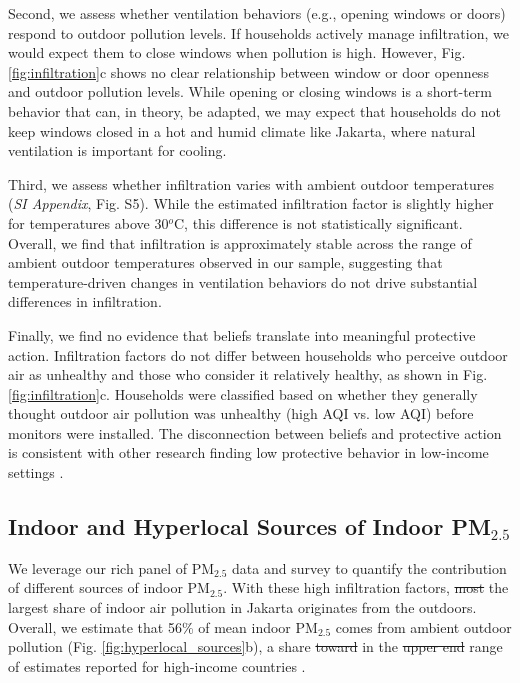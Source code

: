 \documentclass[9pt,twocolumn,twoside]{pnas-new}
\providecommand{\DIFadd}[1]{{\protect\color{red}#1}}
\providecommand{\DIFdel}[1]{{\protect\color{red}\protect\sout{#1}}}
\begin{document}
Second, we assess whether ventilation behaviors (e.g., opening windows or doors) respond to outdoor pollution levels. If households actively manage infiltration, we would expect them to close windows when pollution is high. However, Fig. \ref{fig:infiltration}c shows no clear relationship between window or door openness and outdoor pollution levels. While opening or closing windows is a short-term behavior that can, in theory, be adapted, we may expect that households do not keep windows closed in a hot and humid climate like Jakarta, where natural ventilation is important for cooling. 

\DIFadd{Third, we assess whether infiltration varies with ambient outdoor temperatures (}\textit{\DIFadd{SI Appendix}}\DIFadd{, Fig. S5). While the estimated infiltration factor is slightly higher for temperatures above 30$^o$C, this difference is not statistically significant. Overall, we find that infiltration is approximately stable across the range of ambient outdoor temperatures observed in our sample, suggesting that temperature-driven changes in ventilation behaviors do not drive substantial differences in infiltration.}

Finally, we find no evidence that beliefs translate into meaningful protective action. Infiltration factors do not differ between households who perceive outdoor air as unhealthy and those who consider it relatively healthy, as shown in Fig. \ref{fig:infiltration}c. Households were classified based on whether they generally thought outdoor air pollution was unhealthy (high AQI vs. low AQI) before monitors were installed. The disconnection between beliefs and protective action is consistent with other research finding low protective behavior in low-income settings \citep{greenstone_indoor_2021, chowdhury_misbeliefs_2025}.

\subsection{Indoor and Hyperlocal Sources of Indoor PM$_{2.5}$}

We leverage our rich panel of PM$_{2.5}$ data and survey to quantify the contribution of different sources of indoor PM$_{2.5}$. With these high infiltration factors, \DIFdel{most} \DIFadd{the largest share of} indoor air pollution in Jakarta originates from the outdoors. Overall, we estimate that 56\% of mean indoor PM$_{2.5}$ comes from ambient outdoor pollution (Fig. \ref{fig:hyperlocal_sources}b), a share \DIFdel{toward} \DIFadd{in} the \DIFdel{upper end} \DIFadd{range} of estimates reported for high-income countries \citep{lunderberg_assessing_2023}.
\end{document}
